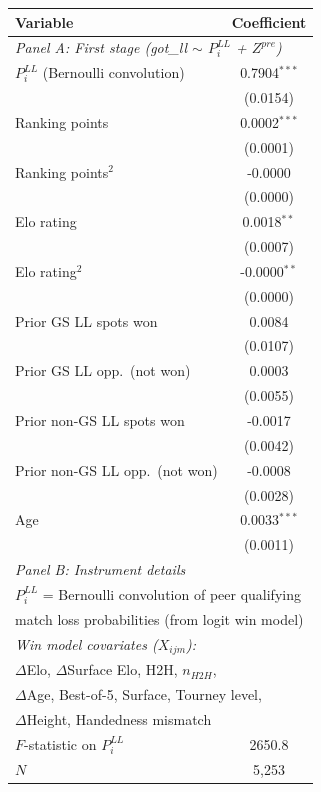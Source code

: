 \begin{tabular}{lc}
\toprule
Variable & Coefficient \\
\midrule
\multicolumn{2}{l}{\textit{Panel A: First stage (got\_ll $\sim$ $P_i^{LL}$ + $Z^{pre}$)}} \\[3pt]
$P_i^{LL}$ (Bernoulli convolution) & 0.7904$^{***}$ \\
 & (0.0154) \\
Ranking points & 0.0002$^{***}$ \\
 & (0.0001) \\
Ranking points$^2$ & -0.0000 \\
 & (0.0000) \\
Elo rating & 0.0018$^{**}$ \\
 & (0.0007) \\
Elo rating$^2$ & -0.0000$^{**}$ \\
 & (0.0000) \\
Prior GS LL spots won & 0.0084 \\
 & (0.0107) \\
Prior GS LL opp.\ (not won) & 0.0003 \\
 & (0.0055) \\
Prior non-GS LL spots won & -0.0017 \\
 & (0.0042) \\
Prior non-GS LL opp.\ (not won) & -0.0008 \\
 & (0.0028) \\
Age & 0.0033$^{***}$ \\
 & (0.0011) \\
\midrule
\multicolumn{2}{l}{\textit{Panel B: Instrument details}} \\[3pt]
\multicolumn{2}{l}{$P_i^{LL}$ = Bernoulli convolution of peer qualifying} \\
\multicolumn{2}{l}{match loss probabilities (from logit win model)} \\[3pt]
\multicolumn{2}{l}{\textit{Win model covariates ($X_{ijm}$):}} \\
\multicolumn{2}{l}{$\Delta$Elo, $\Delta$Surface Elo, H2H, $n_{H2H}$,} \\
\multicolumn{2}{l}{$\Delta$Age, Best-of-5, Surface, Tourney level,} \\
\multicolumn{2}{l}{$\Delta$Height, Handedness mismatch} \\
\midrule
$F$-statistic on $P_i^{LL}$ & 2650.8 \\
$N$ & 5,253 \\
\bottomrule
\end{tabular}
